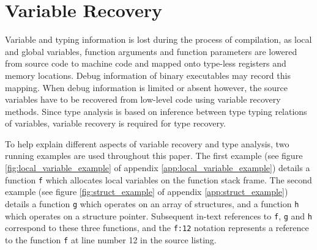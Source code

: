 
\section{Variable Recovery}

Variable and typing information is lost during the process of compilation, as local and global variables, function arguments and function parameters are lowered from source code to machine code and mapped onto type-less registers and memory locations. Debug information of binary executables may record this mapping. When debug information is limited or absent however, the source variables have to be recovered from low-level code using variable recovery methods. Since type analysis is based on inference between type typing relations of variables, variable recovery is required for type recovery.

To help explain different aspects of variable recovery and type analysis, two running examples are used throughout this paper. The first example (see figure \ref{fig:local_variable_example} of appendix \ref{app:local_variable_example}) details a function \texttt{f} which allocates local variables on the function stack frame. The second example (see figure \ref{fig:struct_example} of appendix \ref{app:struct_example}) details a function \texttt{g} which operates on an array of structures, and a function \texttt{h} which operates on a structure pointer. Subsequent in-text references to \texttt{f}, \texttt{g} and \texttt{h} correspond to these three functions, and the \texttt{f:12} notation represents a reference to the function \texttt{f} at line number 12 in the source listing.




